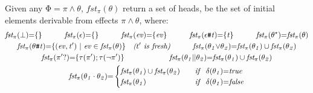 \documentclass[acmsmall,10pt,review]{acmart}
\newcommand{\es}{\theta}
\newcommand{\ev}{ev}
\newcommand{\effect}{{\ensuremath{\mathrm{\Phi}}}}
\newcommand{\code}[1]{{\tt{\ensuremath{\m{#1}}}}}
\newcommand{\m}{\mathit}
\newcommand{\mysharp}{{\mathrel{\texttt{\#}}}}
\begin{document}
{\vspace{2mm}
\begin{definition}[First]\label{First}
  Given any \code{\effect {=} \pi \wedge \es},
  \code{fst_{{\pi}}(\es)} return a set of heads, be the set of initial elements   
  derivable from effects \code{\pi \wedge \es}, where: 
    { 
   \begin{gather*} 
  \code{fst_{{\pi}}( \bot ) {=} \{\} } \qquad\quad 
  \code{fst_{{\pi}}( \epsilon) {=}  \{\} } \qquad\quad
  \code{fst_{{\pi}}( \ev) {=} \{ \ev \}  }
  \qquad\quad
  \code{fst_{{\pi}}(  \epsilon \mysharp  t) {=}  \{ t \}}
  \qquad\quad
  \code{fst_{{\pi}}( {\es^\star} ) {=} fst_{{\pi}}({ \es})}
   \\
   \code{fst_{{\pi}}(\es \mysharp  t) {=}  \{(\ev, t^\prime) \ | \ \ev \in fst_{\pi}(\es) \}} 
   \ \ \  \emph{($t^\prime$\ is\ fresh)}
  \quad  
  \qquad
  \code{fst_{{\pi}}(  \es_1 {\vee} \es_2) {=} fst_{{\pi}}(  \es_1) \cup fst_{{\pi}}(  \es_2)  }  
  \\
  \code{fst_{{\pi}}( \pi^\prime? ) {=} \{\tau(\pi^\prime); \tau(\neg \pi^\prime)\}  }
      \qquad\qquad\qquad 
     \code{fst_{{\pi}}(  \es_1 {||} \es_2) {=} fst_{{\pi}}(  \es_1) \cup fst_{{\pi}}(  \es_2)  }   
     \\
  {
  \code{fst_{{\pi}}(\es_1 \cdot \es_2) {=} } 
  \begin{cases}
        \code{\code{fst_{{\pi}}(  \es_1)} \cup \code{fst_{{\pi}}(  \es_2)} } \quad   & \code{ if\ \  \delta(\es_1) {=} true}\\
        \code{\code{fst_{{\pi}}(  \es_1)}} & \code{  if\ \  \delta(\es_1) {=} false}
      \end{cases} 
      }  
  \end{gather*}
  }
\end{definition}

\begin{comment}
  \begin{definition}[Heads Subsumption]\label{Subsumption1}
Given two time instances \code{(I, \pi_1, t_1)} and \code{(J, \pi_2, t_2)}, we define the subset relation \code{(I, \pi_1, t_1) {\subseteq} (J, \pi_2, t_2)} as:  \code{I {\subseteq} J} and \code{\pi_1[t_2/t_1]  {\Rightarrow}   \pi_2  }.

\end{definition}
\end{comment}


}
\end{document}
